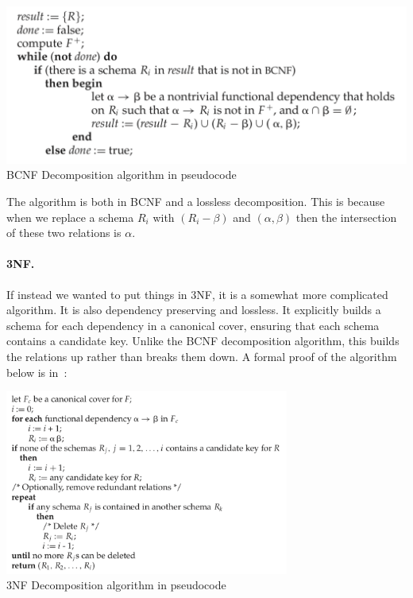 \begin{center}
\includegraphics[width=0.7 \textwidth]{images/bcnf-algorithm}\\
BCNF Decomposition algorithm in pseudocode~\cite{dsc}
\end{center}

The algorithm is both in BCNF and a lossless decomposition. This is because when we replace a schema $R_{i}$ with $(R_{i} - \beta)$ and $(\alpha, \beta)$ then the intersection of these two relations is $\alpha$.

\paragraph{3NF.} If instead we wanted to put things in 3NF, it is a somewhat more complicated algorithm. It is also dependency preserving and lossless. It explicitly builds a schema for each dependency in a canonical cover, ensuring that each schema contains a candidate key. Unlike the BCNF decomposition algorithm, this builds the relations up rather than breaks them down. A formal proof of the algorithm below is in~\cite{dsc}: 

\begin{center}
\includegraphics[width=0.7\textwidth]{images/3nf-algorithm}\\
3NF Decomposition algorithm in pseudocode~\cite{dsc}
\end{center}




